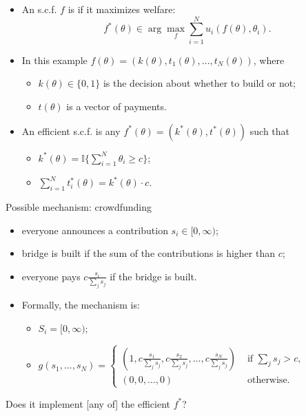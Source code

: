 \documentclass[english,handout,10pt]{beamer}		%
\def\lyxframeend{} %
\begin{document}
\begin{itemize}
	\item An s.c.f. $f$ is  if it maximizes welfare:
	$$f^*(\theta) \in \arg \max_{f} \sum_{i=1}^{N} u_i(f(\theta),\theta_i).$$
	\pause
	\item In this example $f(\theta) = (k(\theta), t_1(\theta), ..., t_N(\theta))$, where
	\begin{itemize}
		\item $k(\theta) \in \{0,1\}$ is the decision about whether to build or not;
		\item $t(\theta)$ is a vector of payments.
	\end{itemize}
	\item An efficient s.c.f. is any $f^*(\theta)=(k^*(\theta),t^*(\theta))$ such that 
	\begin{itemize}
		\item $k^*(\theta) = \mathbb{I} \{ \sum_{i=1}^{N} \theta_i \geq c \}$;
		\item $\sum_{i=1}^{N} t^*_i(\theta) = k^*(\theta) \cdot c$.
	\end{itemize}
\end{itemize}
\lyxframeend


\begin{exampleblock}{Possible mechanism: crowdfunding}
	\begin{itemize}
		\item everyone announces a contribution $s_{i}\in[0,\infty)$;
		\item bridge is built if the sum of the contributions is higher than $c$;
		\item everyone pays $c\frac{s_{i}}{\sum_{j}s_{j}}$ if the bridge is built.
		\pause
		\item Formally, the mechanism is:
		\begin{itemize}
			\item $S_{i}= [0,\infty)$;
			\item $g(s_{1},\dots,s_{N})=
			\begin{cases}
				\left(1,c\frac{s_{1}}{\sum_{j}s_{j}},c\frac{s_{2}}{\sum_{j}s_{j}},\dots,c\frac{s_{N}}{\sum_{j}s_{j}}\right) &\text{ if } \sum_{j}s_{j}>c, \\
				(0,0,\dots,0) &\text{ otherwise.}
			\end{cases}
			$
		\end{itemize}
	\end{itemize}
\end{exampleblock}
\pause
Does it implement [any of] the efficient $f^*$?
\lyxframeend
\end{document}
